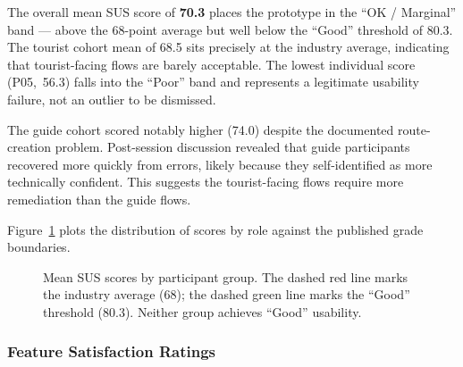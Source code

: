 The overall mean SUS score of \textbf{70.3} places the prototype in the ``OK /
Marginal'' band — above the 68-point average but well below the ``Good'' threshold of
80.3. The tourist cohort mean of 68.5 sits precisely at the industry average, indicating
that tourist-facing flows are barely acceptable. The lowest individual score (P05,~56.3)
falls into the ``Poor'' band and represents a legitimate usability failure, not an
outlier to be dismissed.

The guide cohort scored notably higher (74.0) despite the documented route-creation
problem. Post-session discussion revealed that guide participants recovered more quickly
from errors, likely because they self-identified as more technically confident. This
suggests the tourist-facing flows require more remediation than the guide flows.

Figure~\ref{fig:sus-box} plots the distribution of scores by role against the published
grade boundaries.

\begin{figure}[htbp]
  \centering
  \caption{Mean SUS scores by participant group. The dashed red line marks the industry
  average (68); the dashed green line marks the ``Good'' threshold (80.3).
  Neither group achieves ``Good'' usability.}
  \label{fig:sus-box}
\end{figure}

\subsubsection{Feature Satisfaction Ratings}

